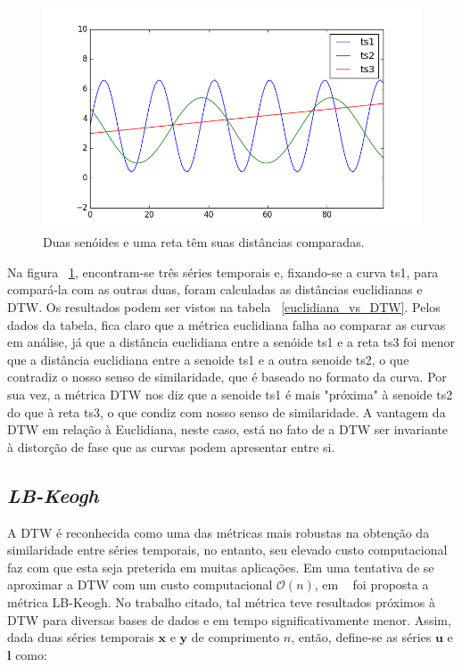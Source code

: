 \begin{figure}[h!]
	\includegraphics[width=\linewidth]{figuras/euclidiana_falha.png}
	\caption{Duas senóides e uma reta têm suas distâncias comparadas.}
	\label{fig:euclidiana_falha}
\end{figure}
 Na figura ~\ref{fig:euclidiana_falha}, encontram-se três séries temporais e, fixando-se a curva ts1, para compará-la com as outras duas, foram calculadas as distâncias euclidianas e DTW. Os resultados podem ser vistos na tabela ~\ref{euclidiana_vs_DTW}. Pelos dados da tabela, fica claro que a métrica euclidiana falha ao comparar as curvas em análise, já que a distância euclidiana entre a senóide ts1 e a reta ts3 foi menor que a distância euclidiana entre a senoide ts1 e a outra senoide ts2, o que contradiz o nosso senso de similaridade, que é baseado no formato da curva. Por sua vez, a métrica DTW nos diz que a senoide ts1 é mais "próxima"  à senoide ts2 do que à reta ts3, o que condiz com nosso senso de similaridade. A vantagem da DTW em relação à Euclidiana, neste caso, está no fato de a DTW ser invariante à distorção de fase que as curvas podem apresentar entre si.

\subsection{\emph{LB-Keogh}}

A DTW é reconhecida como uma das métricas mais robustas na obtenção da similaridade entre séries temporais, no entanto, seu elevado custo computacional faz com que esta seja preterida em muitas aplicações. Em uma tentativa de se aproximar a DTW com um custo computacional $\mathcal{O}(n)$, em ~\parencite{LB_Keogh} foi proposta a métrica LB-Keogh. No trabalho citado, tal métrica teve resultados próximos à DTW para diversas bases de dados e em tempo significativamente menor. Assim, dada duas séries temporais $\bm{x}$ e $\bm{y}$ de comprimento $n$, então, define-se as séries $\bm{u}$ e $\bm{l}$ como:

